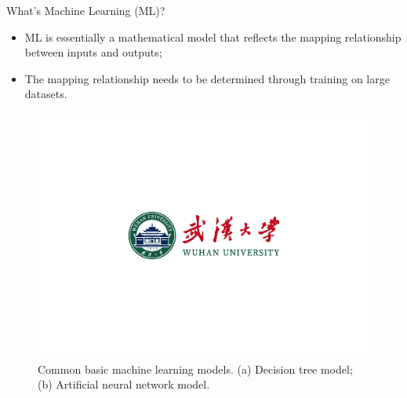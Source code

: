 \documentclass{beamer}
\begin{document}
\begin{frame}{What's Machine Learning (ML)?}
    \small
	\begin{itemize}
		\item {
			ML is essentially a mathematical model that reflects the mapping relationship between inputs and outputs;
		}
		\item {
			The mapping relationship needs to be determined through training on large datasets.
		}
	\end{itemize}

	\begin{figure}
		\centering
		\includegraphics[scale=0.22]{pic/dark.pdf}
		\caption{Common basic machine learning models. (a) Decision tree model; (b) Artificial neural network model.}
		\label{fig2}
	\end{figure}
\end{frame}
\end{document}
